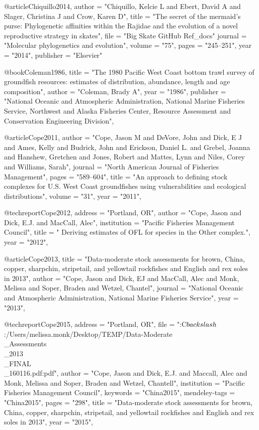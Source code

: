 @article{Chiquillo2014,
  author = "{Chiquillo, Kelcie L and Ebert, David A and Slager, Christina J and Crow, Karen D}",
  title = "{The secret of the mermaid’s purse: Phylogenetic affinities within the Rajidae and the evolution of a novel reproductive strategy in skates}",
  file = "{Big Skate GitHub Ref_docs}"
  journal = "{Molecular phylogenetics and evolution}",
  volume = "{75}",
  pages = "{245--251}",
  year = "{2014}",
  publisher = "{Elsevier}"
}

@book{Coleman1986,
    title = "{The 1980 Pacific West Coast bottom trawl survey of groundfish resources: estimates of distribution, abundance, length and age composition}",
    author = "{Coleman, Brady A}",
    year = "{1986}",
    publisher = "{National Oceanic and Atmospheric Administration, National Marine Fisheries Service, Northwest and Alaska Fisheries Center, Resource Assessment and Conservation Engineering Division}",
}

@article{Cope2011,
    author = "{Cope, Jason M and DeVore, John and Dick, E J and Ames, Kelly and Budrick, John and Erickson, Daniel L. and Grebel, Joanna and Hanshew, Gretchen and Jones, Robert and Mattes, Lynn and Niles, Corey and Williams, Sarah}",
    journal = "{North American Journal of Fisheries Management}",
    pages = "{589--604}",
    title = "{{An approach to defining stock complexes for U.S. West Coast groundfishes using vulnerabilities and ecological distributions}}",
    volume = "{31}",
    year = "{2011}",
}

@techreport{Cope2012,
    address = "{Portland, OR}",
    author = "{Cope, Jason and Dick, E.J. and MacCall, Alec}",
    institution = "{Pacific Fisheries Management Council}",
    title = "{{ Deriving estimates of OFL for species in the Other\nFish complex.}}",
    year = "{2012}",
}

@article{Cope2013,
    title = "{Data-moderate stock assessments for brown, China, copper, sharpchin, stripetail, and yellowtail rockfishes and English and rex soles in 2013}",
    author = "{Cope, Jason and Dick, EJ and MacCall, Alec and Monk, Melissa and Soper, Braden and Wetzel, Chantel}",
    journal = "{National Oceanic and Atmospheric Administration, National Marine Fisheries Service}",
    year = "{2013}",
}

@techreport{Cope2015,
    address = "{Portland, OR}",
    file = "{:C$\\backslash$:/Users/melissa.monk/Desktop/TEMP/Data-Moderate\\_Assessments\\_2013\\_FINAL\\_160116.pdf:pdf}",
    author = "{Cope, Jason and Dick, E.J. and Maccall, Alec and Monk, Melissa and Soper, Braden and Wetzel, Chantell}",
    institution = "{Pacific Fisheries Management Council}",
    keywords = "{China2015}",
    mendeley-tags = "{China2015}",
    pages = "{298}",
    title = "{{Data-moderate stock assessments for brown, China, copper, sharpchin, stripetail, and yellowtail rockfishes and English and rex soles in 2013}}",
    year = "{2015}",
}

